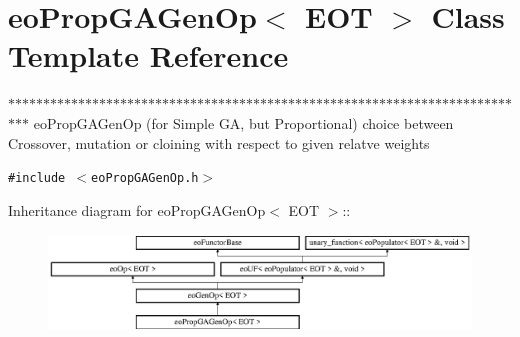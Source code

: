 \section{eo\-Prop\-GAGen\-Op$<$ EOT $>$ Class Template Reference}
\label{classeo_prop_g_a_gen_op}
$\ast$$\ast$$\ast$$\ast$$\ast$$\ast$$\ast$$\ast$$\ast$$\ast$$\ast$$\ast$$\ast$$\ast$$\ast$$\ast$$\ast$$\ast$$\ast$$\ast$$\ast$$\ast$$\ast$$\ast$$\ast$$\ast$$\ast$$\ast$$\ast$$\ast$$\ast$$\ast$$\ast$$\ast$$\ast$$\ast$$\ast$$\ast$$\ast$$\ast$$\ast$$\ast$$\ast$$\ast$$\ast$$\ast$$\ast$$\ast$$\ast$$\ast$$\ast$$\ast$$\ast$$\ast$$\ast$$\ast$$\ast$$\ast$$\ast$$\ast$$\ast$$\ast$$\ast$$\ast$$\ast$$\ast$$\ast$$\ast$$\ast$$\ast$$\ast$$\ast$$\ast$$\ast$$\ast$ eo\-Prop\-GAGen\-Op (for Simple GA, but Proportional) choice between Crossover, mutation or cloining with respect to given relatve weights  


{\tt \#include $<$eo\-Prop\-GAGen\-Op.h$>$}

Inheritance diagram for eo\-Prop\-GAGen\-Op$<$ EOT $>$::\begin{figure}[H]
\begin{center}
\leavevmode
\includegraphics[height=2.54835cm]{classeo_prop_g_a_gen_op}
\end{center}
\end{figure}
